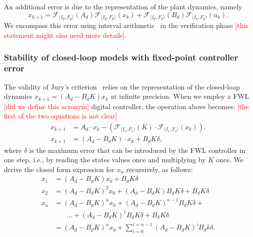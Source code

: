\documentclass[twocolumn]{autart}    %
\renewcommand{\note}[1]{\textcolor{red}{[#1]}}
\begin{document}
An additional error is due to the representation of the plant dynamics, namely 
%
{\scriptsize
\begin{equation*}
x_{k+1} =\mathcal{F}_{\langle I_p,F_p \rangle}(A_d) \mathcal{F}_{\langle I_p,F_p \rangle}(x_{k}) + \mathcal{F}_{\langle I_p,F_p \rangle}(B_d)\mathcal{F}_{\langle I_p,F_p \rangle}(u_{k}).
\end{equation*}
}
We encompass this error using interval arithmetic~\cite{moore1966interval} in the verification phase \note{this statement might also need more details}. 

\subsubsection{Stability of closed-loop models with fixed-point controller error}
\label{sec:stab_FWL}
The validity of Jury's criterion~\cite{fadali} relies on the representation of the closed-loop dynamics $x_{k+1} = (A_d - B_dK) x_k$ at infinite precision.  
When we employ a FWL \note{did we define this acronym} digital controller, the operation above becomes: 
\note{the first of the two equations is not clear}
%
\begin{align*}
x_{k+1} &= A_d \cdot x_{k} -(\mathcal{F}_{\langle I_c,F_c \rangle}(K)\cdot\mathcal{F}_{\langle I_c,F_c \rangle}(x_{k})).  \\
x_{k+1} &= (A_d  - B_dK) \cdot x_k + B_dK\delta, 
\end{align*}
%
where $\delta$ is the maximum error that can be introduced by the FWL controller in one step, 
i.e., by reading the states values once and multiplying by $K$ once.  
We derive the closed form expression for $x_n$ recursively, as follows:
%
\small
\begin{align*}
x_{1} &= (A_d  - B_dK)x_0 + B_dK\delta \\
x_{2} %
 &=(A_d  - B_dK)^2x_0 + (A_d  - B_dK)B_dK\delta + B_dK\delta \\
x_{n} &= (A_d  - B_dK)^nx_0 + (A_d  - B_dK)^{n-1}B_dK\delta +\\
&\phantom{{}=1} ... + (A_d  - B_dK)^1B_dK \delta + B_dK\delta \\
  &= (A_d - B_dK)^nx_0 + \sum_{i=0}^{i=n-1}(A_d - B_dK)^iB_dk\delta. 
\end{align*}
\end{document}
